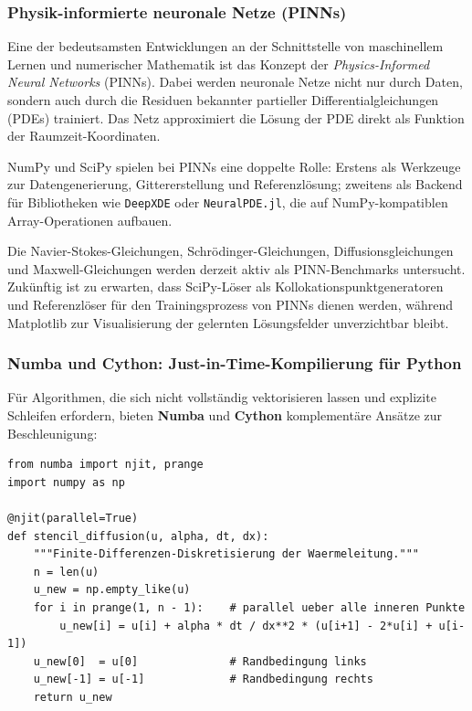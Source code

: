 \documentclass[12pt, a4paper]{article}
\begin{document}
\subsubsection{Physik-informierte neuronale Netze (PINNs)}
\label{subsubsec:pinn}

Eine der bedeutsamsten Entwicklungen an der Schnittstelle von maschinellem
Lernen und numerischer Mathematik ist das Konzept der
\emph{Physics-Informed Neural Networks} (PINNs). Dabei werden neuronale
Netze nicht nur durch Daten, sondern auch durch die Residuen bekannter
partieller Differentialgleichungen (PDEs) trainiert. Das Netz approximiert
die Lösung der PDE direkt als Funktion der Raumzeit-Koordinaten.

NumPy und SciPy spielen bei PINNs eine doppelte Rolle: Erstens als
Werkzeuge zur Datengenerierung, Gittererstellung und Referenzlösung;
zweitens als Backend für Bibliotheken wie \texttt{DeepXDE} oder
\texttt{NeuralPDE.jl}, die auf NumPy-kompatiblen Array-Operationen aufbauen.

Die Navier-Stokes-Gleichungen, Schrödinger-Gleichungen, Diffusionsgleichungen
und Maxwell-Gleichungen werden derzeit aktiv als PINN-Benchmarks untersucht.
Zukünftig ist zu erwarten, dass SciPy-Löser als Kollokationspunktgeneratoren
und Referenzlöser für den Trainingsprozess von PINNs dienen werden, während
Matplotlib zur Visualisierung der gelernten Lösungsfelder unverzichtbar bleibt.

\subsubsection{Numba und Cython: Just-in-Time-Kompilierung für Python}
\label{subsubsec:numba}

Für Algorithmen, die sich nicht vollständig vektorisieren lassen und
explizite Schleifen erfordern, bieten \textbf{Numba} und \textbf{Cython}
komplementäre Ansätze zur Beschleunigung:

\begin{lstlisting}[caption={Numba: JIT-Kompilierung von Python-Schleifen}]
from numba import njit, prange
import numpy as np

@njit(parallel=True)
def stencil_diffusion(u, alpha, dt, dx):
    """Finite-Differenzen-Diskretisierung der Waermeleitung."""
    n = len(u)
    u_new = np.empty_like(u)
    for i in prange(1, n - 1):    # parallel ueber alle inneren Punkte
        u_new[i] = u[i] + alpha * dt / dx**2 * (u[i+1] - 2*u[i] + u[i-1])
    u_new[0]  = u[0]              # Randbedingung links
    u_new[-1] = u[-1]             # Randbedingung rechts
    return u_new
\end{lstlisting}
\end{document}
